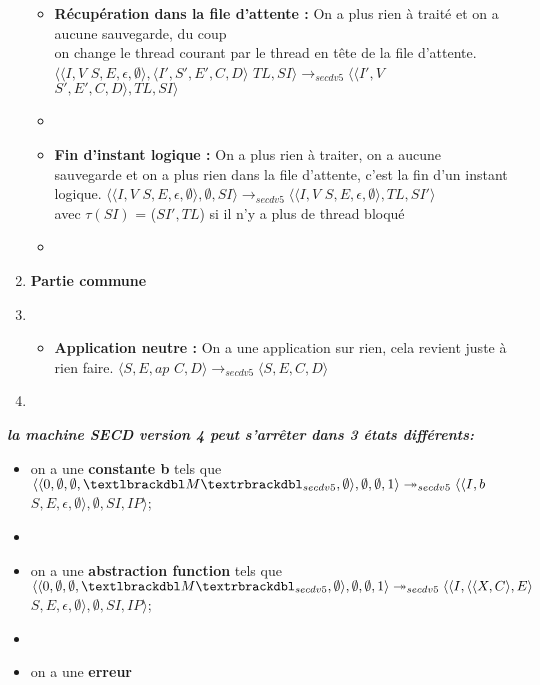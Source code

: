 \documentclass[10pt,a4paper]{article}
\begin{document}
\begin{enumerate}
\begin{itemize}
				\item[] \textbf{Récupération dans la file d'attente :} On a plus rien à traité et on a aucune sauvegarde, du coup 
				\\on change le thread courant par le thread en tête de la file d'attente.
				\smallbreak
				$\langle\langle I,V$ $S,E,\epsilon,\emptyset\rangle,\langle I',S',E',C,D\rangle$ $TL,SI\rangle 
				\longrightarrow_{secdv5} 
				\langle\langle I',V$ $S',E',C,D\rangle,TL,SI\rangle$
				\item[]
				
				\item[] \textbf{Fin d'instant logique :} On a plus rien à traiter, on a aucune sauvegarde et on a plus rien dans la file d'attente, c'est la fin d'un instant logique.
				\smallbreak
				$\langle\langle I,V$ $S,E,\epsilon,\emptyset \rangle ,\emptyset,SI\rangle 
				\longrightarrow_{secdv5} 
				\langle\langle I,V$ $S,E,\epsilon,\emptyset\rangle,TL,SI'\rangle$
				\\avec  $\tau(SI)$ = ($SI',TL$) si il n'y a plus de thread bloqué
				\item[]
				
			\end{itemize}
			\item[] \textbf{Partie commune} 
			\item[]
			\begin{itemize}
				\item[] \textbf{Application neutre :} On a une application sur rien, cela revient juste à rien faire.
				\smallbreak 
				$\langle S,E,ap$ $C,D\rangle
				\longrightarrow_{secdv5} 
				\langle S,E,C,D\rangle$
			\end{itemize}
			
			\item[]
		\end{enumerate}
		\bigbreak
		\bigbreak
		
		
		\textbf{\textit{la machine SECD version 4 peut s'arrêter dans 3 états différents:}}
		\smallbreak
		\begin{itemize}
			\item[] on a une \textbf{constante b} tels que 
			$\langle\langle 0,\emptyset,\emptyset,\textlbrackdbl M\textrbrackdbl_{secdv5},\emptyset\rangle,\emptyset,\emptyset,1\rangle 
			\twoheadrightarrow_{secdv5} 
			\langle\langle I,b$ $S,E,\epsilon,\emptyset\rangle,\emptyset,SI,IP\rangle$;
			\item[] 
			\item[] on a une \textbf{abstraction function} tels que
			$\langle\langle 0,\emptyset,\emptyset,\textlbrackdbl M\textrbrackdbl_{secdv5},\emptyset\rangle,\emptyset,\emptyset,1\rangle 
			\twoheadrightarrow_{secdv5} 
			\langle\langle I,\langle\langle X,C\rangle,E\rangle$ $S,E,\epsilon,\emptyset\rangle,\emptyset,SI,IP\rangle$;
			\item[] 
			\item[] on a une \textbf{erreur} 
		\end{itemize}
		\newpage
\end{document}
